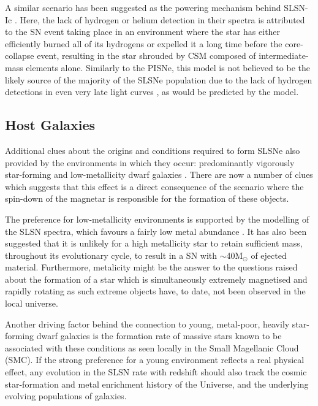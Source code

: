 A similar scenario has been suggested as the powering mechanism behind SLSN-Ic \citep{Chevalier2011}. Here, the lack of hydrogen or helium detection in their spectra is attributed to the SN event taking place in an environment where the star has either efficiently burned all of its hydrogens or expelled it a long time before the core-collapse event, resulting in the star shrouded by CSM composed of intermediate-mass elements alone. Similarly to the PISNe, this model is not believed to be the likely source of the majority of the SLSNe population due to the lack of hydrogen detections in even very late light curves \citep{Jerkstrand2016}, as would be predicted by the model.

\subsection{Host Galaxies}
Additional clues about the origins and conditions required to form SLSNe also provided by the environments in which they occur: predominantly vigorously star-forming and low-metallicity dwarf galaxies \citep[e.g.,][]{Lunnan2014,Leloudas2015,Angus2016}. There are now a number of clues which suggests that this effect is a direct consequence of the scenario where the spin-down of the magnetar is responsible for the formation of these objects.

The preference for low-metallicity environments is supported by the modelling of the SLSN spectra, which favours a fairly low metal abundance \citep{Mazzali2015}. It has also been suggested \citep{Nomoto2016} that it is unlikely for a high metallicity star to retain sufficient mass, throughout its evolutionary cycle, to result in a SN with $\sim$40M$_{\odot}$ of ejected material. Furthermore, metalicity might be the answer to the questions raised about the formation of a star which is simultaneously extremely magnetised and rapidly rotating as such extreme objects have, to date, not been observed in the local universe.

Another driving factor behind the connection to young, metal-poor, heavily star-forming dwarf galaxies is the formation rate of massive stars known to be associated with these conditions as seen locally in the Small Magellanic Cloud (SMC). If the strong preference for a young environment reflects a real physical effect, any evolution in the SLSN rate with redshift should also track the cosmic star-formation and metal enrichment history of the Universe, and the underlying evolving populations of galaxies.

